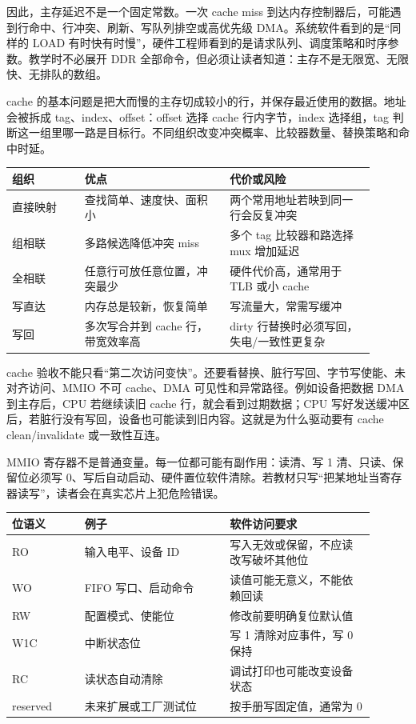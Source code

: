 因此，主存延迟不是一个固定常数。一次 cache miss 到达内存控制器后，可能遇到行命中、行冲突、刷新、写队列排空或高优先级 DMA。系统软件看到的是“同样的 LOAD 有时快有时慢”，硬件工程师看到的是请求队列、调度策略和时序参数。教学时不必展开 DDR 全部命令，但必须让读者知道：主存不是无限宽、无限快、无排队的数组。

cache 的基本问题是把大而慢的主存切成较小的行，并保存最近使用的数据。地址会被拆成 tag、index、offset：offset 选择 cache 行内字节，index 选择组，tag 判断这一组里哪一路是目标行。不同组织改变冲突概率、比较器数量、替换策略和命中时延。

\begin{longtable}{L{0.18\linewidth}L{0.36\linewidth}L{0.36\linewidth}}
\toprule
组织 & 优点 & 代价或风险 \\
\midrule
直接映射 & 查找简单、速度快、面积小 & 两个常用地址若映到同一行会反复冲突 \\
组相联 & 多路候选降低冲突 miss & 多个 tag 比较器和路选择 mux 增加延迟 \\
全相联 & 任意行可放任意位置，冲突最少 & 硬件代价高，通常用于 TLB 或小 cache \\
写直达 & 内存总是较新，恢复简单 & 写流量大，常需写缓冲 \\
写回 & 多次写合并到 cache 行，带宽效率高 & dirty 行替换时必须写回，失电/一致性更复杂 \\
\bottomrule
\end{longtable}

cache 验收不能只看“第二次访问变快”。还要看替换、脏行写回、字节写使能、未对齐访问、MMIO 不可 cache、DMA 可见性和异常路径。例如设备把数据 DMA 到主存后，CPU 若继续读旧 cache 行，就会看到过期数据；CPU 写好发送缓冲区后，若脏行没有写回，设备也可能读到旧内容。这就是为什么驱动要有 cache clean/invalidate 或一致性互连。

MMIO 寄存器不是普通变量。每一位都可能有副作用：读清、写 1 清、只读、保留位必须写 0、写后自动启动、硬件置位软件清除。若教材只写“把某地址当寄存器读写”，读者会在真实芯片上犯危险错误。

\begin{longtable}{L{0.18\linewidth}L{0.36\linewidth}L{0.36\linewidth}}
\toprule
位语义 & 例子 & 软件访问要求 \\
\midrule
RO & 输入电平、设备 ID & 写入无效或保留，不应读改写破坏其他位 \\
WO & FIFO 写口、启动命令 & 读值可能无意义，不能依赖回读 \\
RW & 配置模式、使能位 & 修改前要明确复位默认值 \\
W1C & 中断状态位 & 写 1 清除对应事件，写 0 保持 \\
RC & 读状态自动清除 & 调试打印也可能改变设备状态 \\
reserved & 未来扩展或工厂测试位 & 按手册写固定值，通常为 0 \\
\bottomrule
\end{longtable}

